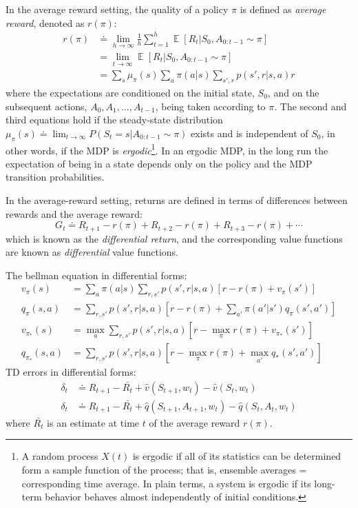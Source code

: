 \documentclass[lang=en,mode=normal,device=normal,color=blue,12pt]{elegantnote}
\DeclareMathOperator*{\1}{\mathbbm{1}}
\DeclareMathOperator*{\E}{\mathbb{E}}
\begin{document}
\begin{appendices}
In the average reward setting, the quality of a policy $\pi$ is defined as \textit{average reward}, denoted as $r(\pi)$:
\begin{align*}
r(\pi) & \doteq \lim_{h \to \infty} \frac{1}{h} \sum_{t=1}^{h} \E [R_t | S_0, A_{0:t-1}\sim \pi]\\
& = \lim_{t \to \infty} \E [R_t | S_0, A_{0:t-1}\sim \pi]\\
& = \sum_s \mu_\pi(s) \sum_a \pi(a|s) \sum_{s',r} p(s',r|s,a)r
\end{align*}
where the expectations are conditioned on the initial state, $S_0$, and on the subsequent actions, $A_0, A_1, \dots, A_{t-1}$, being taken according to $\pi$. The second and third equations hold if the steady-state distribution $\mu_\pi(s) \doteq \lim_{t\to\infty}P(S_t = s | A_{0:t-1}\sim\pi)$ exists and is independent of $S_0$, in other words, if the MDP is \textit{ergodic}\footnote{A random process $X(t)$ is ergodic if all of its statistics can be determined form a sample function of the process; that is, ensemble averages = corresponding time average. In plain terms, a system is ergodic if its long-term behavior behaves almost independently of initial conditions.}.
In an ergodic MDP, in the long run the expectation of being in a state depends only on the policy and the MDP transition probabilities.

In the average-reward setting, returns are defined in terms of differences between rewards and the average reward:
\[
G_t \doteq R_{t+1} - r(\pi) + R_{t+2} - r(\pi) + R_{t+3} - r(\pi) + \cdots
\]
which is known as the \textit{differential return}, and the corresponding value functions are known as \textit{differential} value functions.

The bellman equation in differential forms:
\begin{align*}
v_\pi(s) & = \sum_a \pi(a|s) \sum_{r,s'} p(s',r|s,a)[r-r(\pi)+v_\pi(s')]\\
q_\pi(s,a) & = \sum_{r,s'}p(s',r|s,a)[r-r(\pi)+\sum_{a'}\pi(a'|s')q_\pi(s',a')]\\
v_{\pi_*}(s) & = \max_a \sum_{r,s'} p(s',r|s,a)[r-\max_\pi r(\pi)+v_{\pi_*}(s')]\\
q_{\pi_*}(s,a) & = \sum_{r,s'}p(s',r|s,a)[r-\max_\pi r(\pi)+\max_{a'}q_*(s',a')]
\end{align*}
TD errors in differential forms:
\begin{align*}
\delta_t & \doteq R_{t+1} - \bar{R_t} + \hat{v}(S_{t+1}, w_t) - \hat{v}(S_t, w_t)\\
\delta_t & \doteq R_{t+1} - \bar{R_t} + \hat{q}(S_{t+1},A_{t+1},w_t) - \hat{q}(S_t, A_t, w_t)
\end{align*}
where $\bar{R_t}$ is an estimate at time $t$ of the average reward $r(\pi)$.


\end{appendices}
\end{document}
